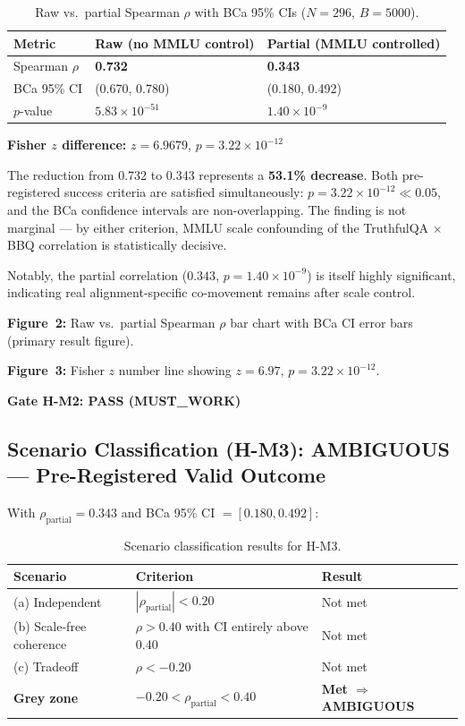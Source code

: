 \begin{table}[h]
\centering
\caption{Raw vs.\ partial Spearman $\rho$ with BCa 95\% CIs ($N{=}296$, $B{=}5000$).}
\label{tab:hm2}
\begin{tabular}{@{}lll@{}}
\toprule
Metric & Raw (no MMLU control) & Partial (MMLU controlled) \\
\midrule
Spearman $\rho$ & \textbf{0.732} & \textbf{0.343} \\
BCa 95\% CI     & (0.670, 0.780) & (0.180, 0.492) \\
$p$-value       & $5.83 \times 10^{-51}$ & $1.40 \times 10^{-9}$ \\
\bottomrule
\end{tabular}
\end{table}

\textbf{Fisher $z$ difference:} $z = 6.9679$, $p = 3.22 \times 10^{-12}$

The reduction from 0.732 to 0.343 represents a \textbf{53.1\% decrease}. Both pre-registered success criteria are satisfied simultaneously: $p = 3.22 \times 10^{-12} \ll 0.05$, and the BCa confidence intervals are non-overlapping. The finding is not marginal --- by either criterion, MMLU scale confounding of the TruthfulQA $\times$ BBQ correlation is statistically decisive.

Notably, the partial correlation ($0.343$, $p = 1.40 \times 10^{-9}$) is itself highly significant, indicating real alignment-specific co-movement remains after scale control.

\textbf{Figure~2:} Raw vs.\ partial Spearman $\rho$ bar chart with BCa CI error bars (primary result figure).

\textbf{Figure~3:} Fisher $z$ number line showing $z = 6.97$, $p = 3.22 \times 10^{-12}$.

\textbf{Gate H-M2: PASS (MUST\_WORK)}

\subsection{Scenario Classification (H-M3): AMBIGUOUS --- Pre-Registered Valid Outcome}

With $\rho_{\text{partial}} = 0.343$ and BCa 95\% CI $= [0.180, 0.492]$:

\begin{table}[h]
\centering
\caption{Scenario classification results for H-M3.}
\label{tab:hm3}
\begin{tabular}{@{}lll@{}}
\toprule
Scenario & Criterion & Result \\
\midrule
(a) Independent    & $|\rho_{\text{partial}}| < 0.20$ & Not met \\
(b) Scale-free coherence & $\rho > 0.40$ with CI entirely above 0.40 & Not met \\
(c) Tradeoff       & $\rho < -0.20$ & Not met \\
\textbf{Grey zone} & $-0.20 < \rho_{\text{partial}} < 0.40$ & \textbf{Met $\Rightarrow$ AMBIGUOUS} \\
\bottomrule
\end{tabular}
\end{table}

